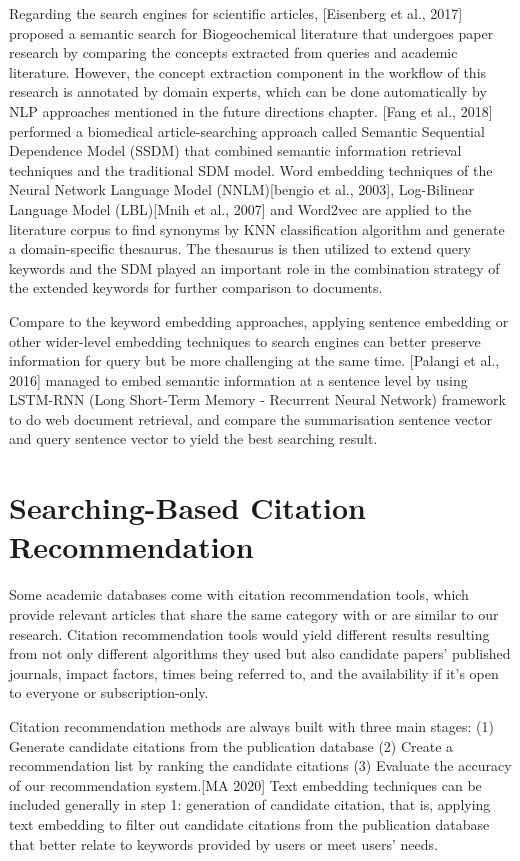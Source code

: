 Regarding the search engines for scientific articles, [Eisenberg et al., 2017] proposed a semantic search for Biogeochemical literature that undergoes paper research by comparing the concepts extracted from queries and academic literature.
However, the concept extraction component in the workflow of this research is annotated by domain experts, which can be done automatically by NLP approaches mentioned in the future directions chapter.
[Fang et al., 2018] performed a biomedical article-searching approach called Semantic Sequential Dependence Model (SSDM) that combined semantic information retrieval techniques and the traditional SDM model.
Word embedding techniques of the Neural Network Language Model (NNLM)[bengio et al., 2003], Log-Bilinear Language Model (LBL)[Mnih et al., 2007] and Word2vec are applied to the literature corpus to find synonyms by KNN classification algorithm and generate a domain-specific thesaurus.
The thesaurus is then utilized to extend query keywords and the SDM played an important role in the combination strategy of the extended keywords for further comparison to documents.

Compare to the keyword embedding approaches, applying sentence embedding or other wider-level embedding techniques to search engines can better preserve information for query but be more challenging at the same time.
[Palangi et al., 2016] managed to embed semantic information at a sentence level by using LSTM-RNN (Long Short-Term Memory - Recurrent Neural Network) framework to do web document retrieval, and compare the summarisation sentence vector and query sentence vector to yield the best searching result.


\section{Searching-Based Citation Recommendation}

Some academic databases come with citation recommendation tools, which provide relevant articles that share the same category with or are similar to our research.
Citation recommendation tools would yield different results resulting from not only different algorithms they used but also candidate papers' published journals, impact factors, times being referred to, and the availability if it's open to everyone or subscription-only.

Citation recommendation methods are always built with three main stages: (1) Generate candidate citations from the publication database (2) Create a recommendation list by ranking the candidate citations (3) Evaluate the accuracy of our recommendation system.[MA 2020]
Text embedding techniques can be included generally in step 1: generation of candidate citation, that is, applying text embedding to filter out candidate citations from the publication database that better relate to keywords provided by users or meet users' needs.

